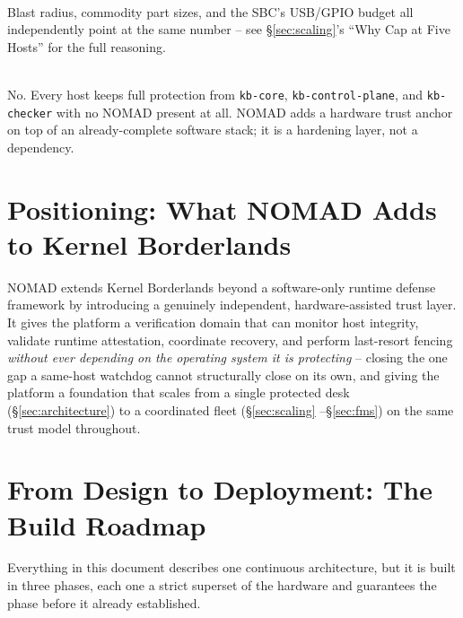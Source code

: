 \documentclass[11pt,a4paper]{article}
\begin{document}
\begin{description}[leftmargin=1.2em, style=nextline, itemsep=0.7em]
\item[Why five hosts per chassis, and not, say, ten or twenty?] \hfill
\\ Blast radius, commodity part sizes, and the SBC's USB/GPIO budget
all independently point at the same number -- see
\S\ref{sec:scaling}'s ``Why Cap at Five Hosts'' for the full reasoning.

\item[Is NOMAD required to use Kernel Borderlands at all?] \hfill \\
No. Every host keeps full protection from \texttt{kb-core},
\texttt{kb-control-plane}, and \texttt{kb-checker} with no NOMAD present
at all. NOMAD adds a hardware trust anchor on top of an already-complete
software stack; it is a hardening layer, not a dependency.

\end{description}

\section{Positioning: What NOMAD Adds to Kernel Borderlands}

NOMAD extends Kernel Borderlands beyond a software-only runtime defense
framework by introducing a genuinely independent, hardware-assisted
trust layer. It gives the platform a verification domain that can
monitor host integrity, validate runtime attestation, coordinate
recovery, and perform last-resort fencing \emph{without ever depending
on the operating system it is protecting} -- closing the one gap a
same-host watchdog cannot structurally close on its own, and giving the
platform a foundation that scales from a single protected desk
(\S\ref{sec:architecture}) to a coordinated fleet (\S\ref{sec:scaling}
--\S\ref{sec:fms}) on the same trust model throughout.

\section{From Design to Deployment: The Build Roadmap}
\label{sec:roadmap}

Everything in this document describes one continuous architecture, but
it is built in three phases, each one a strict superset of the
hardware and guarantees the phase before it already established.
\end{document}
